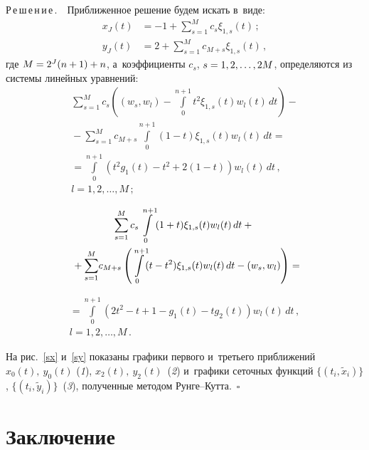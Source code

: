 \begin{multicols}{2}
\noindent
Р\,е\,ш\,е\,н\,и\,е\,.\ \ 
Приближенное решение будем искать в~виде: 
\begin{align*}
x_{J}(t)&=-1+\sum\limits_{s=1}^M 
c_{s} {\xi}_{1,s}(t)\,;\\
y_{J}(t)&=2+\sum\limits_{s=1}^M c_{M+s} {\xi}_{1,s}(t)\,, 
\end{align*}
где $M\hm=2^J(n+1)+n$, а~коэффициенты $c_s$, $s\hm=1,2,\ldots, 2M$, определяются 
из системы линейных уравнений:
\begin{multline*}
\sum\limits_{s=1}^M c_s\left((w_s,w_l)-
\int\limits_{0}^{n+1}\!t^2{\xi}_{1,s}(t)w_l(t)\,dt\right)-{}\\
{}-\sum\limits_{s=1}^M c_{M+s}\int\limits_0^{n+1}(1-t){\xi}_{1,s}(t)w_l(t)\,dt={}\\
{}=\!\int\limits_0^{n+1}\!\left(t^2g_1(t)-t^2+2(1-t)\right)w_l(t)\,dt\,,\\
 l=1,2,\dots,M\,;
\end{multline*}

\vspace*{-12pt}

\noindent
\begin{multline*}
\sum\limits_{s=1}^M c_s\int\limits_{0}^{n+1}(1+t){\xi}_{1,s}(t)w_l(t)\,dt+{}\\
{}+
\sum\limits_{s=1}^M \!c_{M+s}\left(\int\limits_0^{n+1}\!(t-t^2){\xi}_{1,s}(t)w_l(t)\,dt-
\left(w_s,w_l\right)\right)={}\hspace*{-6.37675pt}
\end{multline*}


\noindent
\begin{multline*}
{}=\int\limits_0^{n+1}(2t^2-t+1-g_1(t)-tg_2(t))w_l(t)\,dt\,, 
\\
 l=1,2,\dots,M\,.
\end{multline*}


На рис.~\ref{sx} и~\ref{sy} показаны графики первого и~треть\-его приближений 
$x_0(t),~y_0(t)$ (\textit{1}), $x_2(t),~y_2(t)$~(\textit{2}) 
и~графики сеточных функций $\{(t_i,\tilde{x}_i)\}$, $\{(t_i,\tilde{y}_i)\}$~(\textit{3}), 
полученные методом Рун\-ге--Кутта.~\hfill$\square$

\vspace*{-6pt}

\section{Заключение}

\vspace*{-2pt}


\end{multicols}
